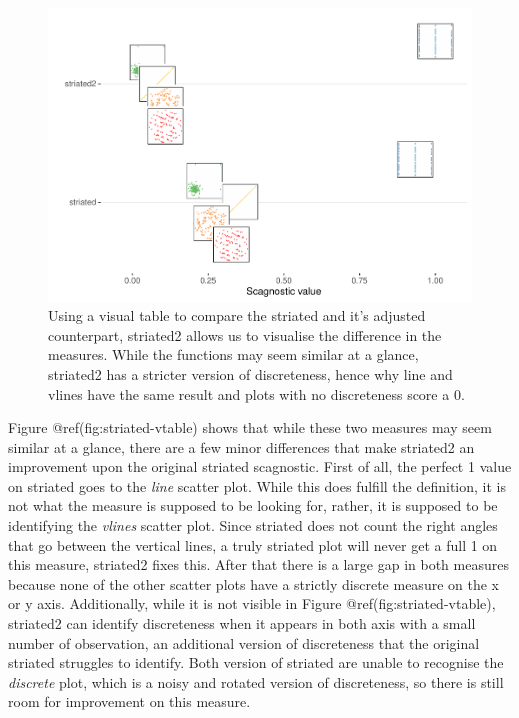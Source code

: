 \begin{Schunk}
\begin{figure}
\includegraphics[width=1\linewidth]{mason-lee-laa-cook_files/figure-latex/striated-vtable-1} \caption[Using a visual table to compare the striated and it's adjusted counterpart, striated2 allows us to visualise the difference in the measures]{Using a visual table to compare the striated and it's adjusted counterpart, striated2 allows us to visualise the difference in the measures. While the functions may seem similar at a glance, striated2 has a stricter version of discreteness, hence why line and vlines have the same result and plots with no discreteness score a 0.}\label{fig:striated-vtable}
\end{figure}
\end{Schunk}

Figure @ref(fig:striated-vtable) shows that while these two measures may
seem similar at a glance, there are a few minor differences that make
striated2 an improvement upon the original striated scagnostic. First of
all, the perfect 1 value on striated goes to the \emph{line} scatter
plot. While this does fulfill the definition, it is not what the measure
is supposed to be looking for, rather, it is supposed to be identifying
the \emph{vlines} scatter plot. Since striated does not count the right
angles that go between the vertical lines, a truly striated plot will
never get a full 1 on this measure, striated2 fixes this. After that
there is a large gap in both measures because none of the other scatter
plots have a strictly discrete measure on the x or y axis. Additionally,
while it is not visible in Figure @ref(fig:striated-vtable), striated2
can identify discreteness when it appears in both axis with a small
number of observation, an additional version of discreteness that the
original striated struggles to identify. Both version of striated are
unable to recognise the \emph{discrete} plot, which is a noisy and
rotated version of discreteness, so there is still room for improvement
on this measure.

